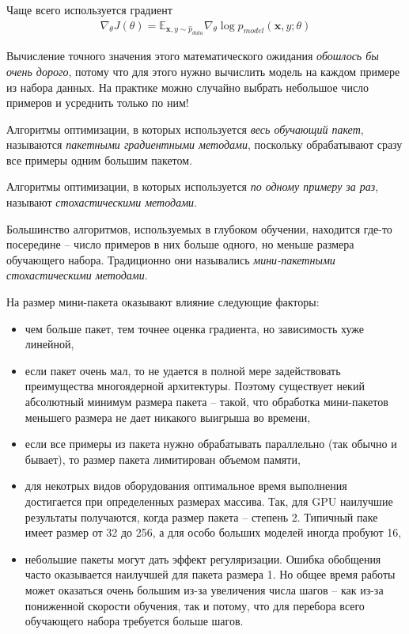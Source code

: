 \documentclass[%
	11pt,
	a4paper,
	utf8,
]{article}
\begin{document}
Чаще всего используется градиент
\begin{align*}
	\nabla_{\theta} J(\theta) = \mathbb{E}_{\mathbf{x}, y \sim \hat{p}_{data}} \nabla_{\theta} \log p_{model}(\mathbf{x}, y; \theta)
\end{align*}

Вычисление точного значения этого математического ожидания \emph{\color{red}обошлось бы очень дорого}, потому что для этого нужно вычислить модель на каждом примере из набора данных. {\color{blue}На практике можно случайно выбрать небольшое число примеров и усреднить только по ним!}

Алгоритмы оптимизации, в которых используется \emph{весь обучающий пакет}, называются \emph{пакетными градиентными методами}, поскольку обрабатывают сразу все примеры одним большим пакетом.

Алгоритмы оптимизации, в которых используется \emph{по одному примеру за раз}, называют \emph{стохастическими методами}.

Большинство алгоритмов, используемых в глубоком обучении, находится где-то посередине -- число примеров в них больше одного, но меньше размера обучающего набора. Традиционно они назывались \emph{мини-пакетными стохастическими методами}.

На размер мини-пакета оказывают влияние следующие факторы:
\begin{itemize}
	\item чем больше пакет, тем точнее оценка градиента, но зависимость хуже линейной,
	
	\item если пакет очень мал, то не удается в полной мере задействовать преимущества многоядерной архитектуры. Поэтому существует некий абсолютный минимум размера пакета -- такой, что обработка мини-пакетов меньшего размера не дает никакого выигрыша во времени,
	
	\item если все примеры из пакета нужно обрабатывать параллельно (так обычно и бывает), то размер пакета лимитирован объемом памяти,
	
	\item для некотрых видов оборудования оптимальное время выполнения  достигается при определенных размерах массива. Так, для GPU наилучшие результаты получаются, когда размер пакета -- степень 2. Типичный паке имеет размер от 32 до 256, а для особо больших моделей иногда пробуют 16,
	
	\item небольшие пакеты могут дать эффект регуляризации. Ошибка обобщения часто оказывается наилучшей для пакета размера 1. Но общее время работы может оказаться очень большим из-за увеличения числа шагов -- как из-за пониженной скорости обучения, так и потому, что для перебора всего обучающего набора требуется больше шагов.
\end{itemize}
\end{document}
